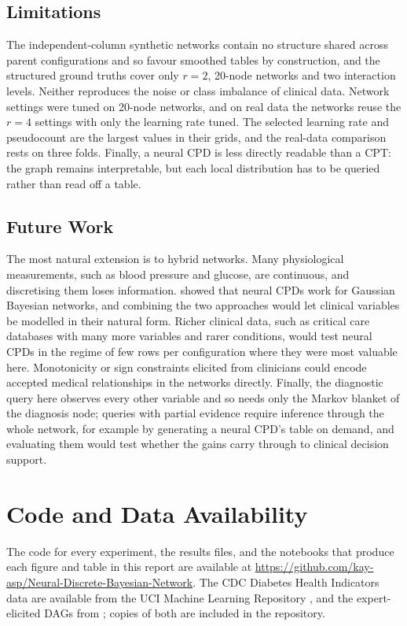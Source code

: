 \documentclass[a4paper,fleqn]{cas-dc}
\begin{document}
\subsection{Limitations}

The independent-column synthetic networks contain no structure shared across parent configurations and so favour smoothed tables by construction, and the structured ground truths cover only $r=2$, 20-node networks and two interaction levels. Neither reproduces the noise or class imbalance of clinical data. Network settings were tuned on 20-node networks, and on real data the networks reuse the $r=4$ settings with only the learning rate tuned. The selected learning rate and pseudocount are the largest values in their grids, and the real-data comparison rests on three folds. Finally, a neural CPD is less directly readable than a CPT: the graph remains interpretable, but each local distribution has to be queried rather than read off a table.

\subsection{Future Work}

The most natural extension is to hybrid networks. Many physiological measurements, such as blood pressure and glucose, are continuous, and discretising them loses information. \citet{Gaogle2026} showed that neural CPDs work for Gaussian Bayesian networks, and combining the two approaches would let clinical variables be modelled in their natural form. Richer clinical data, such as critical care databases with many more variables and rarer conditions, would test neural CPDs in the regime of few rows per configuration where they were most valuable here. Monotonicity or sign constraints elicited from clinicians could encode accepted medical relationships in the networks directly. Finally, the diagnostic query here observes every other variable and so needs only the Markov blanket of the diagnosis node; queries with partial evidence require inference through the whole network, for example by generating a neural CPD's table on demand, and evaluating them would test whether the gains carry through to clinical decision support.

\section*{Code and Data Availability}

The code for every experiment, the results files, and the notebooks that produce each figure and table in this report are available at \url{https://github.com/kay-asp/Neural-Discrete-Bayesian-Network}. The CDC Diabetes Health Indicators data are available from the UCI Machine Learning Repository \citep{cdc_diabetes_2023}, and the expert-elicited DAGs from \citet{zahoor2025investigatingvaliditystructurelearning}; copies of both are included in the repository.
\end{document}
